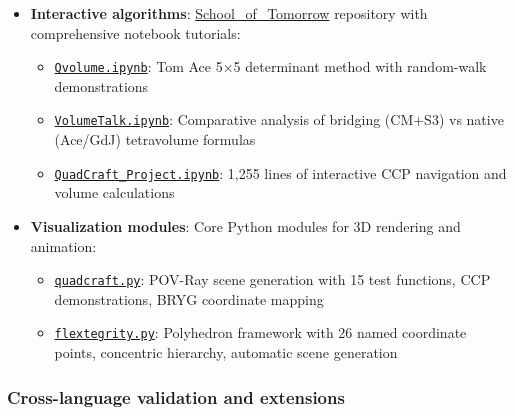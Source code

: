 \documentclass[
]{article}
\providecommand{\tightlist}{%
  \setlength{\itemsep}{0pt}\setlength{\parskip}{0pt}}
\begin{document}
\begin{itemize}
\tightlist
\item
  \textbf{Interactive algorithms}:
  \href{https://github.com/4dsolutions/School_of_Tomorrow}{School\_of\_Tomorrow}
  repository with comprehensive notebook tutorials:

  \begin{itemize}
  \tightlist
  \item
    \href{https://github.com/4dsolutions/School_of_Tomorrow/blob/master/Qvolume.ipynb}{\texttt{Qvolume.ipynb}}:
    Tom Ace 5×5 determinant method with random-walk demonstrations
  \item
    \href{https://github.com/4dsolutions/School_of_Tomorrow/blob/master/VolumeTalk.ipynb}{\texttt{VolumeTalk.ipynb}}:
    Comparative analysis of bridging (CM+S3) vs native (Ace/GdJ)
    tetravolume formulas
  \item
    \href{https://github.com/4dsolutions/School_of_Tomorrow/blob/master/QuadCraft_Project.ipynb}{\texttt{QuadCraft\_Project.ipynb}}:
    1,255 lines of interactive CCP navigation and volume calculations
  \end{itemize}
\item
  \textbf{Visualization modules}: Core Python modules for 3D rendering
  and animation:

  \begin{itemize}
  \tightlist
  \item
    \href{https://github.com/4dsolutions/School_of_Tomorrow/blob/master/quadcraft.py}{\texttt{quadcraft.py}}:
    POV-Ray scene generation with 15 test functions, CCP demonstrations,
    BRYG coordinate mapping
  \item
    \href{https://github.com/4dsolutions/School_of_Tomorrow/blob/master/flextegrity.py}{\texttt{flextegrity.py}}:
    Polyhedron framework with 26 named coordinate points, concentric
    hierarchy, automatic scene generation
  \end{itemize}
\end{itemize}

\hypertarget{cross-language-validation-and-extensions}{%
\subsubsection{Cross-language validation and
extensions}\label{cross-language-validation-and-extensions}}
\end{document}
